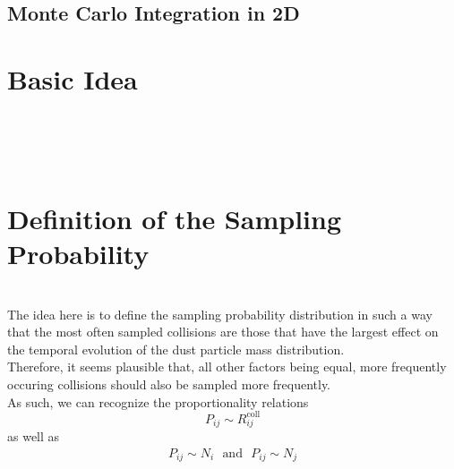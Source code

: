     \subsection{Monte Carlo Integration in 2D}


\section{Basic Idea}

     \\
     \\
     \\

\section{Definition of the Sampling Probability}

     \\

    The idea here is to define the sampling probability distribution in such a way that the most 
    often sampled collisions are those that have the largest effect on the temporal evolution of 
    the dust particle mass distribution. \\

    Therefore, it seems plausible that, all other factors being equal, more frequently occuring 
    collisions should also be sampled more frequently. \\

    As such, we can recognize the proportionality relations
    \begin{equation}
        P_{ij} \sim R^\text{coll}_{ij}
    \end{equation}
    as well as 
    \begin{align}
        P_{ij} \sim N_i 
        \ \ \ \text{and} \ \ \
        P_{ij} \sim N_j
    \end{align}

